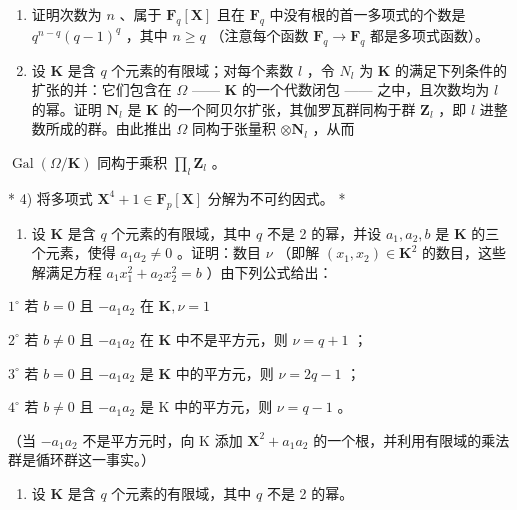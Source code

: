 \begin{enumerate}
\def\labelenumi{\arabic{enumi})}
\setcounter{enumi}{1}
\item
  证明次数为 \(n\) 、属于 \(\mathbf{F}_q[\mathbf{X}]\) 且在 \(\mathbf{F}_q\) 中没有根的首一多项式的个数是 \(q^{n - q}(q - 1)^q\) ，其中 \(n \geqslant q\) （注意每个函数 \(\mathbf{F}_q \to \mathbf{F}_q\) 都是多项式函数）。
\item
  设 \(\mathbf{K}\) 是含 \(q\) 个元素的有限域；对每个素数 \(l\) ，令 \(N_{l}\) 为 \(\mathbf{K}\) 的满足下列条件的扩张的并：它们包含在 \(\Omega\) —— \(\mathbf{K}\) 的一个代数闭包 —— 之中，且次数均为 \(l\) 的幂。证明 \(\mathbf{N}_{l}\) 是 \(\mathbf{K}\) 的一个阿贝尔扩张，其伽罗瓦群同构于群 \(\mathbf{Z}_{l}\) ，即 \(l\) 进整数所成的群。由此推出 \(\Omega\) 同构于张量积 \(\otimes \mathbf{N}_{l}\) ，从而
\end{enumerate}

\(\operatorname{Gal}(\Omega / \mathbf{K})\) 同构于乘积 \(\prod_{l} \mathbf{Z}_l\) 。

* 4) 将多项式 \(\mathbf{X}^4 + 1 \in \mathbf{F}_p[\mathbf{X}]\) 分解为不可约因式。 *

\begin{enumerate}
\def\labelenumi{\arabic{enumi})}
\setcounter{enumi}{4}
\tightlist
\item
  设 \(\mathbf{K}\) 是含 \(q\) 个元素的有限域，其中 \(q\) 不是 2 的幂，并设 \(a_1, a_2, b\) 是 \(\mathbf{K}\) 的三个元素，使得 \(a_1a_2 \neq 0\) 。证明：数目 \(\nu\) （即解 \((x_1, x_2) \in \mathbf{K}^2\) 的数目，这些解满足方程 \(a_1x_1^2 + a_2x_2^2 = b\) ）由下列公式给出：
\end{enumerate}

\(1^{\circ}\) 若 \(b = 0\) 且 \(-a_{1}a_{2}\) 在 \(\mathbf{K},\nu = 1\)

\(2^{\circ}\) 若 \(b \neq 0\) 且 \(-a_{1}a_{2}\) 在 \(\mathbf{K}\) 中不是平方元，则 \(\nu = q + 1\) ；

\(3^{\circ}\) 若 \(b = 0\) 且 \(-a_{1}a_{2}\) 是 \(\mathbf{K}\) 中的平方元，则 \(\nu = 2q - 1\) ；

\(4^{\circ}\) 若 \(b \neq 0\) 且 \(-a_{1}a_{2}\) 是 K 中的平方元，则 \(\nu = q - 1\) 。

（当 \(-a_{1}a_{2}\) 不是平方元时，向 K 添加 \(\mathbf{X}^{2} + a_{1}a_{2}\) 的一个根，并利用有限域的乘法群是循环群这一事实。）

\begin{enumerate}
\def\labelenumi{\arabic{enumi})}
\setcounter{enumi}{5}
\tightlist
\item
  设 \(\mathbf{K}\) 是含 \(q\) 个元素的有限域，其中 \(q\) 不是 2 的幂。
\end{enumerate}


